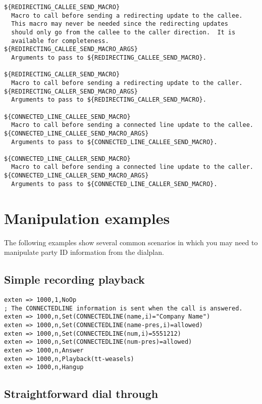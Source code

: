 \begin{verbatim}
${REDIRECTING_CALLEE_SEND_MACRO}
  Macro to call before sending a redirecting update to the callee.
  This macro may never be needed since the redirecting updates
  should only go from the callee to the caller direction.  It is
  available for completeness.
${REDIRECTING_CALLEE_SEND_MACRO_ARGS}
  Arguments to pass to ${REDIRECTING_CALLEE_SEND_MACRO}.

${REDIRECTING_CALLER_SEND_MACRO}
  Macro to call before sending a redirecting update to the caller.
${REDIRECTING_CALLER_SEND_MACRO_ARGS}
  Arguments to pass to ${REDIRECTING_CALLER_SEND_MACRO}.

${CONNECTED_LINE_CALLEE_SEND_MACRO}
  Macro to call before sending a connected line update to the callee.
${CONNECTED_LINE_CALLEE_SEND_MACRO_ARGS}
  Arguments to pass to ${CONNECTED_LINE_CALLEE_SEND_MACRO}.

${CONNECTED_LINE_CALLER_SEND_MACRO}
  Macro to call before sending a connected line update to the caller.
${CONNECTED_LINE_CALLER_SEND_MACRO_ARGS}
  Arguments to pass to ${CONNECTED_LINE_CALLER_SEND_MACRO}.
\end{verbatim}

\section{Manipulation examples}

The following examples show several common scenarios in which you may need
to manipulate party ID information from the dialplan.

\subsection{Simple recording playback}

\begin{verbatim}
exten => 1000,1,NoOp
; The CONNECTEDLINE information is sent when the call is answered.
exten => 1000,n,Set(CONNECTEDLINE(name,i)="Company Name")
exten => 1000,n,Set(CONNECTEDLINE(name-pres,i)=allowed)
exten => 1000,n,Set(CONNECTEDLINE(num,i)=5551212)
exten => 1000,n,Set(CONNECTEDLINE(num-pres)=allowed)
exten => 1000,n,Answer
exten => 1000,n,Playback(tt-weasels)
exten => 1000,n,Hangup
\end{verbatim}

\subsection{Straightforward dial through}

